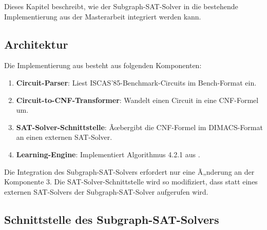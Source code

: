 ﻿\documentclass[a4paper,12pt]{article}
\theoremstyle{definition}
\begin{document}
Dieses Kapitel beschreibt, wie der Subgraph-SAT-Solver in die bestehende Implementierung aus der Masterarbeit integriert werden kann.

\subsection{Architektur}

Die Implementierung aus \cite{Epp13} besteht aus folgenden Komponenten:
\begin{enumerate}
    \item \textbf{Circuit-Parser}: Liest ISCAS'85-Benchmark-Circuits im Bench-Format ein.
    \item \textbf{Circuit-to-CNF-Transformer}: Wandelt einen Circuit in eine CNF-Formel um.
    \item \textbf{SAT-Solver-Schnittstelle}: Ãœbergibt die CNF-Formel im DIMACS-Format an einen externen SAT-Solver.
    \item \textbf{Learning-Engine}: Implementiert Algorithmus 4.2.1 aus \cite{Epp13}.
\end{enumerate}

Die Integration des Subgraph-SAT-Solvers erfordert nur eine Ã„nderung an der Komponente 3. Die SAT-Solver-Schnittstelle wird so modifiziert, dass statt eines externen SAT-Solvers der Subgraph-SAT-Solver aufgerufen wird.

\subsection{Schnittstelle des Subgraph-SAT-Solvers}
\end{document}
